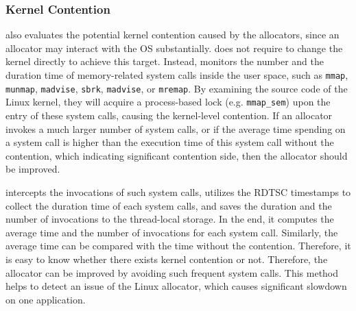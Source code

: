 \subsubsection{Kernel Contention}
\MP{} also evaluates the potential kernel contention caused by the allocators, since an allocator may interact with the OS substantially. \MP{} does not require to change the kernel directly to achieve this target. Instead, \MP{} monitors the number and the duration time of memory-related system calls inside the user space, such as \texttt{mmap}, \texttt{munmap}, \texttt{madvise}, \texttt{sbrk}, \texttt{madvise}, or \texttt{mremap}. By examining the source code of the Linux kernel, they will acquire a process-based lock (e.g. \texttt{mmap\_sem}) upon the entry of these system calls, causing the kernel-level contention. If an allocator invokes a much larger number of system calls, or if the average time spending on a system call is higher than the execution time of this system call without the contention, which indicating significant contention side, then the allocator should be improved. 

\MP{} intercepts the invocations of such system calls, utilizes the RDTSC timestamps to collect the duration time of each system calls, and saves the duration and the number of invocations to the thread-local storage. In the end, it computes the average time and the number of invocations for each system call. Similarly, the average time can be compared with the time without the contention. Therefore, it is easy to know whether there exists kernel contention or not. Therefore, the allocator can be improved by avoiding such frequent system calls. This method helps to detect an issue of the Linux allocator, which causes significant slowdown on one application. 

  

